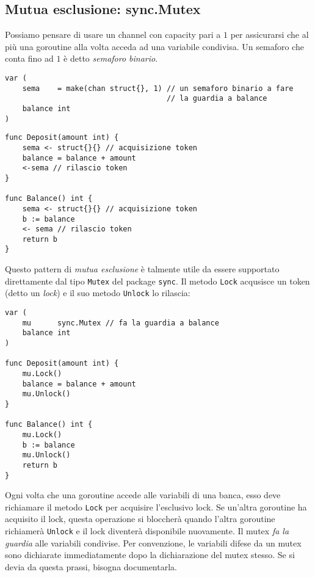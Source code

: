 \documentclass[../../thesis.tex]{subfiles}
\begin{document}
    \subsection{Mutua esclusione: sync.Mutex}\label{subsec:mutua-esclusione:-sync.mutex}
    Possiamo pensare di usare un channel con capacity pari a $1$ per assicurarsi che al più una goroutine alla volta acceda ad una variabile condivisa.
    Un semaforo che conta fino ad $1$ è detto \textit{semaforo binario}.
    \begin{lstlisting}[frame = single, label = {lst:lstlisting9-2.1}]
var (
    sema    = make(chan struct{}, 1) // un semaforo binario a fare
                                     // la guardia a balance
    balance int
)
    \end{lstlisting}
    \clearpage
    \newpage
    \begin{lstlisting}[frame = single, label = {lst:lstlisting9-2.2}]
func Deposit(amount int) {
    sema <- struct{}{} // acquisizione token
    balance = balance + amount
    <-sema // rilascio token
}

func Balance() int {
    sema <- struct{}{} // acquisizione token
    b := balance
    <- sema // rilascio token
    return b
}
    \end{lstlisting}
    Questo pattern di \textit{mutua esclusione} è talmente utile da essere supportato direttamente dal tipo \verb"Mutex" del package \verb"sync".
    Il metodo \verb"Lock" acqusisce un token (detto un \textit{lock}) e il suo metodo \verb"Unlock" lo rilascia:
    \begin{lstlisting}[frame = single, label = {lst:lstlisting9-2.3}]
var (
    mu      sync.Mutex // fa la guardia a balance
    balance int
)

func Deposit(amount int) {
    mu.Lock()
    balance = balance + amount
    mu.Unlock()
}

func Balance() int {
    mu.Lock()
    b := balance
    mu.Unlock()
    return b
}
    \end{lstlisting}
    Ogni volta che una goroutine accede alle variabili di una banca, esso deve richiamare il metodo \verb"Lock" per acquisire l'esclusivo lock.
    Se un'altra goroutine ha acquisito il lock, questa operazione si bloccherà quando l'altra goroutine richiamerà \verb"Unlock" e il lock diventerà disponibile nuovamente.
    Il mutex \textit{fa la guardia} alle variabili condivise.
    Per convenzione, le variabili difese da un mutex sono dichiarate immediatamente dopo la dichiarazione del mutex stesso.
    Se si devia da questa prassi, bisogna documentarla.
    \hfill \vspace{12pt}
\end{document}
